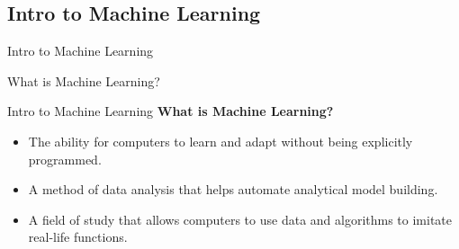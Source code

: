 \documentclass{beamer}
\begin{document}
\subsection{Intro to Machine Learning}
\begin{frame}[fragile]{Intro to Machine Learning}
    \begin{center}
        \Huge What is Machine Learning?
    \end{center}
\end{frame}
\begin{frame}[fragile]{Intro to Machine Learning}
    \textbf{What is Machine Learning?}
    \begin{itemize}
        \item The ability for computers to learn and adapt without being explicitly programmed.
        \pause
        \item A method of data analysis that helps automate analytical model building.
        \pause
        \item A field of study that allows computers to use data and algorithms to imitate real-life functions.
    \end{itemize}
\end{frame}
\end{document}

